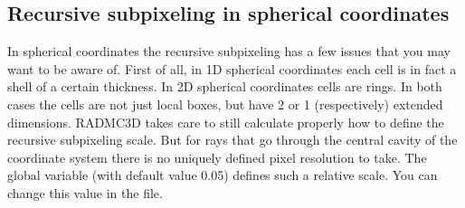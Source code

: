 \documentclass[letterpaper,10pt,english]{sphinxmanual}
\begin{document}
\subsection{Recursive sub\sphinxhyphen{}pixeling in spherical coordinates}
\label{\detokenize{imagesspectra:recursive-sub-pixeling-in-spherical-coordinates}}\label{\detokenize{imagesspectra:sec-rec-subpixel-spher-coord}}
In spherical coordinates the recursive sub\sphinxhyphen{}pixeling has a few issues that
you may want to be aware of. First of all, in 1\sphinxhyphen{}D spherical coordinates each
cell is in fact a shell of a certain thickness. In 2\sphinxhyphen{}D spherical coordinates
cells are rings. In both cases the cells are not just local boxes, but have
2 or 1 (respectively) extended dimensions. RADMC\sphinxhyphen{}3D takes care to still
calculate properly how to define the recursive sub\sphinxhyphen{}pixeling scale. But
for rays that go through the central cavity of the coordinate
system there is no uniquely defined pixel resolution to take. The
global variable  (with default
value 0.05) defines such a relative scale. You can change this value
in the  file.
\end{document}
